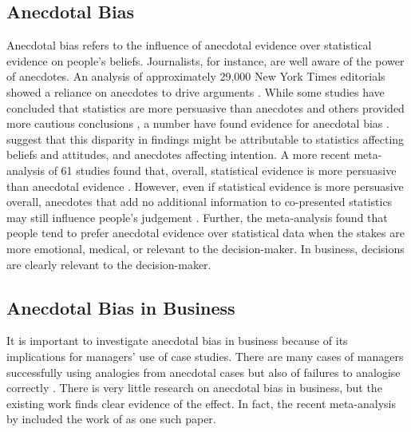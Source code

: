 \documentclass[a4paper, nobind]{templates/ociamthesis}
\theoremstyle{definition}
\theoremstyle{definition}
\theoremstyle{definition}
\theoremstyle{definition}
\theoremstyle{remark}
\begin{document}
\subsection{Anecdotal Bias}

Anecdotal bias refers to the influence of anecdotal evidence over statistical
evidence on people's beliefs. Journalists, for instance, are well aware of the
power of anecdotes. An analysis of approximately 29,000 New York Times
editorials showed a reliance on anecdotes to drive arguments \autocite{alkhatib2017}.
While some studies have concluded that statistics are more persuasive than
anecdotes \autocites[e.g.,][]{allen1997,hornikx2005,hoeken2001} and others provided more
cautious conclusions \autocite{winterbottom2008}, a number have found evidence for
anecdotal bias \autocites[e.g.,][]{reinard1988,shen2015,jaramillo2019,ratcliff2020,reinhart2006}. \textcite{zebregs2015} suggest that this disparity in findings might be
attributable to statistics affecting beliefs and attitudes, and anecdotes
affecting intention. A more recent meta-analysis of 61 studies found that,
overall, statistical evidence is more persuasive than anecdotal evidence
\autocite{freling2020}. However, even if statistical evidence is more persuasive
overall, anecdotes that add no additional information to co-presented statistics
may still influence people's judgement \autocite{jaramillo2019}. Further, the
meta-analysis found that people tend to prefer anecdotal evidence over
statistical data when the stakes are more emotional, medical, or relevant to the
decision-maker. In business, decisions are clearly relevant to the
decision-maker.

\subsection{Anecdotal Bias in Business}

It is important to investigate anecdotal bias in business because of its
implications for managers' use of case studies. There are many cases of managers
successfully using analogies from anecdotal cases but also of failures to
analogise correctly \autocite{gavetti2005,gavetti2005a}. There is very little research
on anecdotal bias in business, but the existing work finds clear evidence of the
effect. In fact, the recent meta-analysis by \textcite{freling2020} included the work of
\textcite{wainberg2013} as one such paper.
\end{document}
